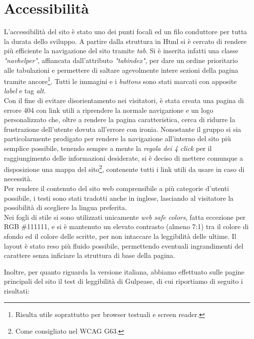 \section{Accessibilità}
\label{sec:access}
L'accessibilità del sito è stato uno dei punti focali ed un filo conduttore per tutta la durata dello sviluppo. A partire dalla struttura in Html si è cercato di rendere più efficiente la navigazione del sito tramite \emph{tab}. Si è inserita infatti una classe \emph{"navhelper"}, affiancata dall'attributo \emph{"tabindex"}, per dare un ordine prioritario alle tabulazioni e permettere di saltare agevolmente intere sezioni della pagina tramite ancore\footnote{Risulta utile soprattutto per browser testuali e screen reader.}. 
Tutti le immagini e i \emph{buttons} sono stati marcati con apposite \emph{label} e tag \emph{alt}.\\
Con il fine di evitare disorientamento nei visitatori, è stata creata una pagina di errore 404 con link utili a riprendere la normale navigazione e un logo personalizzato che, oltre a rendere la pagina caratteristica, cerca di ridurre la frustrazione dell'utente dovuta all'errore con ironia. Nonostante il gruppo si sia particolarmente prodigato per rendere la navigazione all'interno del sito più semplice possibile, tenendo sempre a mente la \emph{regola dei 4 click} per il raggiungimento delle informazioni desiderate, si è deciso di mettere comunque a disposizione una mappa del sito\footnote{Come consigliato nel WCAG G63.}, contenente tutti i link utili da usare in caso di necessità.\\ 
Per rendere il contenuto del sito web comprensibile a più categorie d'utenti possibile, i testi sono stati tradotti anche in inglese, lasciando al visitatore la possibilità di scegliere la lingua preferita.\\
Nei fogli di stile si sono utilizzati unicamente \emph{web safe colors}, fatta eccezione per RGB \#111111, e si è mantenuto un elevato contrasto (almeno 7:1) tra il colore di sfondo ed il colore delle scritte, per non intaccare la leggibilità delle ultime. Il layout è stato reso più fluido possibile, permettendo eventuali ingrandimenti del carattere senza inficiare la struttura di base della pagina. 

\pagebreak
Inoltre, per quanto riguarda la versione italiana, abbiamo effettuato sulle pagine principali del sito il test di leggibilità di Gulpease, di cui riportiamo di seguito i risultati: \\

